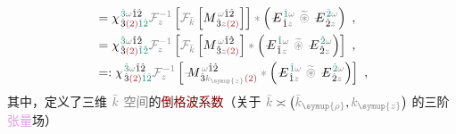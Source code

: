 \begin{subequations}
\begin{align}
	&= {\chi}^{\;\! \textcolor{PineGreen}{\hat{3}} \mathcolor{gray}{\omega} \hat{1} \hat{2} }_{\;\! \hat{3} \textcolor{Maroon}{(2)} \textcolor{PineGreen}{\hat{1} \hat{2}}} \mathcolor{gray}{\mathcal F_{z}^{-1}} \left[ \mathcolor{gray}{\mathcal F_{\bar{k}}} \left[ M^{\;\! \mathcolor{gray}{\omega} \hat{1} \hat{2} }_{\;\! \hat{3} \mathcolor{gray}{z} \textcolor{Maroon}{(2)} } \right] \right] \mathcolor{gray}{*} \left( \Xint{\mathcolor{gray}{-}}{295}{E}^{\;\!\textcolor{PineGreen}{\hat{1}} \mathcolor{gray}{\omega}}_{\;\! \hat{1} \mathcolor{gray}{z}} ~\mathcolor{gray}{\widetilde \circledast}~ \Xint{\mathcolor{gray}{-}}{295}{E}^{\;\!\textcolor{PineGreen}{\hat{2}} \mathcolor{gray}{\omega}}_{\;\! \hat{2} \mathcolor{gray}{z}} \right) ~, \label{eq:DP^(2)-3_12-spectrum-C4} \\
	&= {\chi}^{\;\! \textcolor{PineGreen}{\hat{3}} \mathcolor{gray}{\omega} \hat{1} \hat{2} }_{\;\! \hat{3} \textcolor{Maroon}{(2)} \textcolor{PineGreen}{\hat{1} \hat{2}}} \mathcolor{gray}{\mathcal F_{z}^{-1}} \left[ \mathcolor{gray}{\mathcal F_{\bar{k}}} \left[ M^{\;\! \mathcolor{gray}{\omega} \hat{1} \hat{2} }_{\;\! \hat{3} \mathcolor{gray}{z} \textcolor{Maroon}{(2)} } \right] \mathcolor{gray}{*} \left( \Xint{\mathcolor{gray}{-}}{295}{E}^{\;\!\textcolor{PineGreen}{\hat{1}} \mathcolor{gray}{\omega}}_{\;\! \hat{1} \mathcolor{gray}{z}} ~\mathcolor{gray}{\widetilde \circledast}~ \Xint{\mathcolor{gray}{-}}{295}{E}^{\;\!\textcolor{PineGreen}{\hat{2}} \mathcolor{gray}{\omega}}_{\;\! \hat{2} \mathcolor{gray}{z}} \right) \right] ~, \label{eq:DP^(2)-3_12-spectrum-C5} \\
	&=: {\chi}^{\;\! \textcolor{PineGreen}{\hat{3}} \mathcolor{gray}{\omega} \hat{1} \hat{2} }_{\;\! \hat{3} \textcolor{Maroon}{(2)} \textcolor{PineGreen}{\hat{1} \hat{2}}} \mathcolor{gray}{\mathcal F_{z}^{-1}} \left[ \Xint{\mathcolor{gray}{-}}{18}{M}^{\;\! \mathcolor{gray}{\omega} \hat{1} \hat{2} }_{\;\! \hat{3} \mathcolor{gray}{k_{\symup{z}}} \textcolor{Maroon}{(2)} } \mathcolor{gray}{*} \left( \Xint{\mathcolor{gray}{-}}{295}{E}^{\;\!\textcolor{PineGreen}{\hat{1}} \mathcolor{gray}{\omega}}_{\;\! \hat{1} \mathcolor{gray}{z}} ~\mathcolor{gray}{\widetilde \circledast}~ \Xint{\mathcolor{gray}{-}}{295}{E}^{\;\!\textcolor{PineGreen}{\hat{2}} \mathcolor{gray}{\omega}}_{\;\! \hat{2} \mathcolor{gray}{z}} \right) \right] ~, \label{eq:DP^(2)-3_12-spectrum-C6}
\end{align}
\end{subequations}
其中，定义了三维 $\mathcolor{gray}{\bar{k}}$ \textcolor{gray}{空间}的\textcolor{Maroon}{倒格波系数}（关于 $\mathcolor{gray}{\bar{k}} \asymp \left( \mathcolor{gray}{\bar{k}_{\symup{\rho}}}, \mathcolor{gray}{k_{\symup{z}}} \right)$ 的三阶\textcolor{Plum}{张量}\textcolor{NavyBlue}{场}）
